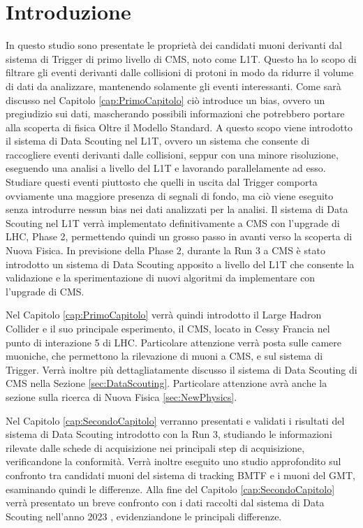 \chapter{Introduzione}
\label{cap:Introduzione}

In questo studio sono presentate le proprietà dei candidati muoni derivanti dal sistema di Trigger di primo livello di CMS, noto come L1T. Questo ha lo scopo di filtrare gli eventi derivanti dalle collisioni di protoni in modo da ridurre il volume di dati da analizzare, mantenendo solamente gli eventi interessanti. Come sarà discusso nel Capitolo \ref{cap:PrimoCapitolo} ciò introduce un bias, ovvero un pregiudizio sui dati, mascherando possibili informazioni che potrebbero portare alla scoperta di fisica Oltre il Modello Standard. A questo scopo viene introdotto il sistema di Data Scouting nel L1T, ovvero un sistema che consente di raccogliere eventi derivanti dalle collisioni, seppur con una minore risoluzione, eseguendo una analisi a livello del L1T e lavorando parallelamente ad esso. Studiare questi eventi piuttosto che quelli in uscita dal Trigger comporta ovviamente una maggiore presenza di segnali di fondo, ma ciò viene eseguito senza introdurre nessun bias nei dati analizzati per la analisi. Il sistema di Data Scouting nel L1T verrà implementato definitivamente a CMS con l'upgrade di LHC, Phase 2, permettendo quindi un grosso passo in avanti verso la scoperta di Nuova Fisica. In previsione della Phase 2, durante la Run 3 a CMS è stato introdotto un sistema di Data Scouting apposito a livello del L1T che consente la validazione e la sperimentazione di nuovi algoritmi da implementare con l'upgrade di CMS.


Nel Capitolo \ref{cap:PrimoCapitolo} verrà quindi introdotto il Large Hadron Collider e il suo principale esperimento, il CMS, locato in Cessy Francia nel punto di interazione 5 di LHC. Particolare attenzione verrà posta sulle camere muoniche, che permettono la rilevazione di muoni a CMS, e sul sistema di Trigger. Verrà inoltre più dettagliatamente discusso il sistema di Data Scouting di CMS nella Sezione \ref{sec:DataScouting}. Particolare attenzione avrà anche la sezione sulla ricerca di Nuova Fisica \ref{sec:NewPhysics}.

Nel Capitolo \ref{cap:SecondoCapitolo} verranno presentati e validati i risultati del sistema di Data Scouting introdotto con la Run 3, studiando le informazioni rilevate dalle schede di acquisizione nei principali step di acquisizione, verificandone la conformità. Verrà inoltre eseguito uno studio approfondito sul confronto tra candidati muoni del sistema di tracking BMTF e i muoni del GMT, esaminando quindi le differenze. Alla fine del Capitolo \ref{cap:SecondoCapitolo} verrà presentato un breve confronto con i dati raccolti dal sistema di Data Scouting nell'anno 2023 \cite{CERNsummerSchool}, evidenziandone le principali differenze.

